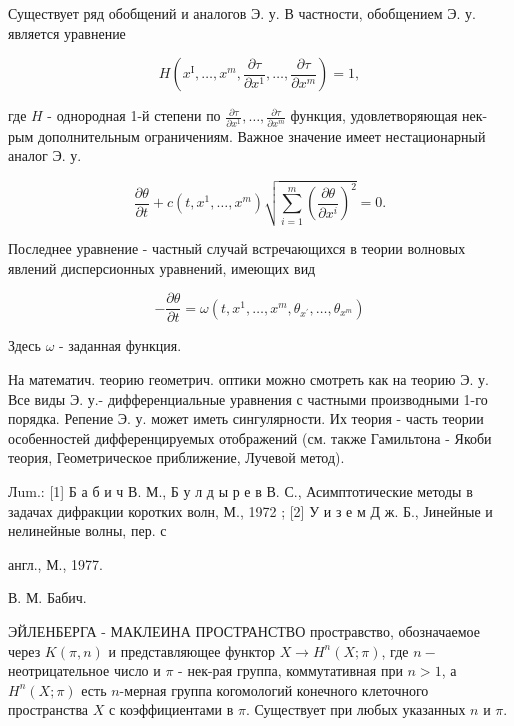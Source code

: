 \documentclass[10pt]{article}
\begin{document}
Существует ряд обобщений и аналогов Э. у. В частности, обобщением Э. у. является уравнение



\[

H\left(x^{\mathrm{I}}, \ldots, x^{m}, \frac{\partial \tau}{\partial x^{1}}, \ldots, \frac{\partial \tau}{\partial x^{m}}\right)=1,

\]



где $H$ - однородная 1-й степени по $\frac{\partial \tau}{\partial x^{1}}, \ldots, \frac{\partial \tau}{\partial x^{m}}$ функция, удовлетворяющая нек-рым дополнительным ограничениям. Важное значение имеет нестационарный аналог Э. у.



\[

\frac{\partial \theta}{\partial t}+c\left(t, x^{1}, \ldots, x^{m}\right) \sqrt{\sum_{i=1}^{m}\left(\frac{\partial \theta}{\partial x^{i}}\right)^{2}}=0 .

\]



Последнее уравнение - частный случай встречающихся в теории волновых явлений дисперсионных уравнений, имеющих вид



\[

-\frac{\partial \theta}{\partial t}=\omega\left(t, x^{1}, \ldots, x^{m}, \theta_{x^{\prime}}, \ldots, \theta_{x^{m}}\right)

\]



Здесь $\omega$ - заданная функция.



На математич. теорию геометрич. оптики можно смотреть как на теорию Э. у. Все виды Э. у.- дифференциальные уравнения с частными производными 1-го порядка. Репение Э. у. может иметь сингулярности. Их теория - часть теории особенностей дифференцируемых отображений (см. также Гамильтона - Якоби теория, Геометрическое приближение, Лучевой метод).



Лum.: [1] Б а б и ч В. М., Б у л д ы р е в В. С., Асимптотические методы в задачах дифракции коротких волн, М., 1972 ; [2] У и з е м Д ж. Б., Јинейные и нелинейные волны, пер. с

англ., М., 1977.

В. М. Бабич.



ЭЙЛЕНБЕРГА - МАКЛЕИНА ПРОСТРАНСТВО простравство, обозначаемое через $K(\pi, n)$ и представляющее функтор $X \rightarrow H^{n}(X ; \pi)$, где $n-$ неотрицательное число и $\pi$ - нек-рая группа, коммутативная при $n>1$, а $H^{n}(X ; \pi)$ есть $n$-мерная группа когомологий конечного клеточного пространства $X$ с коэффициентами в $\pi$. Существует при любых указанных $n$ и $\pi$.
\end{document}
